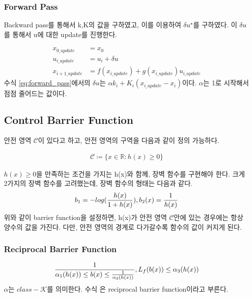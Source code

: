 \documentclass[journal]{IEEEtran}
\begin{document}
\subsubsection{Forward Pass}
Backward pass를 통해서 k,K의 값을 구하였고, 이를 이용하여 $\delta u^{\star}$를 구하였다.
이 $\delta u$를 통해서 u에 대한 update를 진행한다.

\begin{align}
	x_{0\_update}&=x_0\nonumber\\
	u_{i\_update}&=u_i+\delta u\nonumber\\
	x_{i+1\_update}&=f(x_{i\_update})+g(x_{i\_update})u_{i\_update}
	\label{eq:forward_pass}	
\end{align}
수식 \eqref{eq:forward_pass}에서의 $\delta u$는 $\alpha k_i+K_i(x_{i\_update}-x_i)$이다. $\alpha$는 1로 시작해서 점점 줄어드는 값이다.

\subsection{Control Barrier Function}
안전 영역 $\mathcal{C}$이 있다고 하고, 안전 영역의 구역을 다음과 같이 정의 가능하다.

\begin{align}
	\mathcal{C} \coloneqq \{x \in \mathds{R} : h(x) \geq 0 \}
	\label{eq:safe_region}
\end{align}

$h(x) \geq 0$을 만족하는 조건을 가지는 h(x)와 함께, 장벽 함수를 구현해야 한다.
크게 2가지의 장벽 함수를 고려했는데, 장벽 함수의 형태는 다음과 같다.
\begin{align}
	b_1=-log({h(x)\over{1+h(x)}}), b_2(x)={1\over{ h(x)}}
	\label{eq:barrier_function}
\end{align}
위와 같이 barrier function을 설정하면, h(x)가 안전 영역 $\mathcal{C}$안에 있는 경우에는 항상 양수의 값을 가진다. 다만, 안전 영역의 경계로 다가갈수록 함수의 값이 커지게 된다.\\
 \subsubsection{Reciprocal Barrier Function}
 \begin{align}
 	{1 \over \alpha_1(h(x)) \leq b(x) \leq {1\over \alpha_2(h(x))} }, L_f(b(x))\leq \alpha_3(h(x))	
	\label{eq:reciprocal_barrier_function} 
\end{align}
$\alpha$는 $class-\mathcal{K}$를 의미한다. 수식 은 reciprocal barrier function이라고 부른다.
\end{document}
